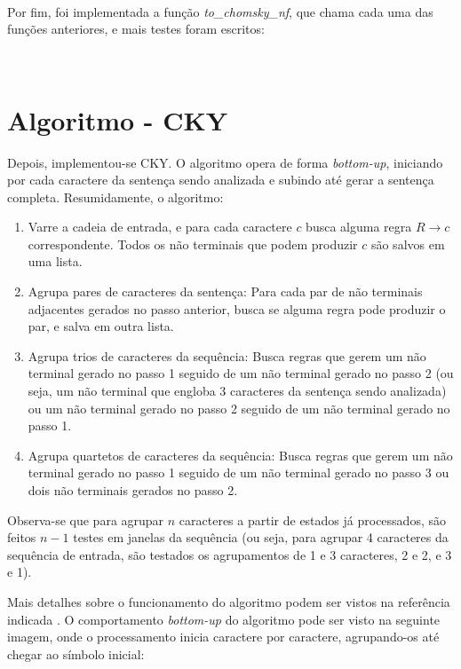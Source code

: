 \documentclass[conference]{IEEEtran}
\begin{document}


\



Por fim, foi implementada a função \emph{to\_chomsky\_nf}, que chama cada uma das funções anteriores, e mais testes foram escritos:



\



\section{Algoritmo - CKY}

Depois, implementou-se CKY. O algoritmo opera de forma \emph{bottom-up}, iniciando por cada caractere da sentença sendo analizada e subindo até gerar a sentença completa. Resumidamente, o algoritmo:

\begin{enumerate}
    \item Varre a cadeia de entrada, e para cada caractere $c$ busca alguma regra $R \to c$ correspondente. Todos os não terminais que podem produzir $c$ são salvos em uma lista.
    \item Agrupa pares de caracteres da sentença: Para cada par de não terminais adjacentes gerados no passo anterior, busca se alguma regra pode produzir o par, e salva em outra lista.
    \item Agrupa trios de caracteres da sequência: Busca regras que gerem um não terminal gerado no passo 1 seguido de um não terminal gerado no passo 2 (ou seja, um não terminal que engloba 3 caracteres da sentença sendo analizada) ou um não terminal gerado no passo 2 seguido de um não terminal gerado no passo 1.
    \item Agrupa quartetos de caracteres da sequência: Busca regras que gerem um não terminal gerado no passo 1 seguido de um não terminal gerado no passo 3 ou dois não terminais gerados no passo 2.
\end{enumerate}

Observa-se que para agrupar $n$ caracteres a partir de estados já processados, são feitos $n - 1$ testes em janelas da sequência (ou seja, para agrupar 4 caracteres da sequência de entrada, são testados os agrupamentos de 1 e 3 caracteres, 2 e 2, e 3 e 1).

Mais detalhes sobre o funcionamento do algoritmo podem ser vistos na referência indicada \cite{cky}. O comportamento \emph{bottom-up} do algoritmo pode ser visto na seguinte imagem, onde o processamento inicia caractere por caractere, agrupando-os até chegar ao símbolo inicial:
\end{document}

